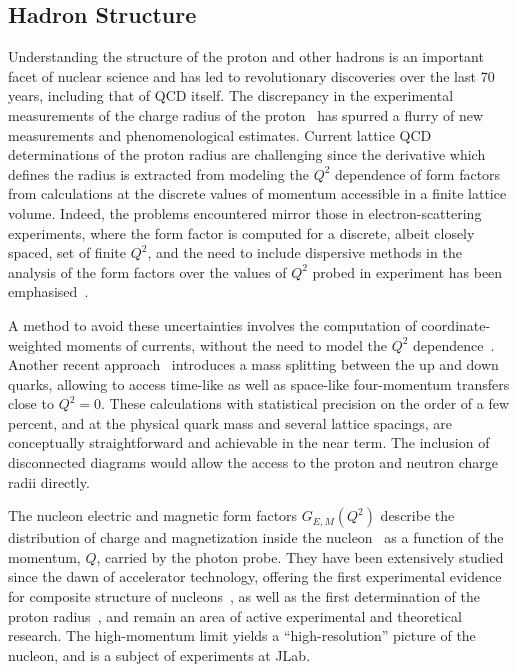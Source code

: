 


\subsection{Hadron Structure}

Understanding the structure of the proton and other hadrons is an important facet of  nuclear science and  has led to revolutionary discoveries over the last 70 years, including that of QCD itself.  
The discrepancy in the experimental measurements of the charge radius of the proton~\cite{Antognini:1900ns} has spurred a flurry of new measurements and phenomenological estimates. Current lattice QCD determinations of the proton radius are challenging since the derivative which defines the radius is extracted from modeling the $Q^2$ dependence of form factors from calculations at the discrete values of momentum accessible in a finite lattice volume.  Indeed, the problems encountered mirror those in electron-scattering experiments, where the form factor is computed for a discrete, albeit closely spaced, set of finite $Q^2$, and the need to include dispersive methods in the analysis of the form factors over the values of $Q^2$ probed in experiment has been emphasised~\cite{Alarcon:2018irp}.

A method to avoid these uncertainties involves the computation of coordinate-weighted moments of currents, without the need to model the $Q^2$ dependence~\cite{Bouchard:2016gmc}. Another recent approach~\cite{Detmold:2018ptb} introduces a mass splitting between the up and down quarks, allowing to access time-like as well as space-like four-momentum transfers close to $Q^2=0$. These calculations with statistical precision on the order of a few percent, and at the physical quark mass and several lattice spacings, are conceptually straightforward and achievable in the near term. The inclusion of disconnected diagrams would allow the access to the proton and neutron charge radii directly.

The nucleon electric and magnetic form factors $G_{E,M}(Q^2)$ describe the distribution of charge and
magnetization inside the
nucleon~\cite{Burkardt:2000za,Burkardt:2002hr,Miller:2007uy,Carlson:2007xd} as a function of the momentum, $Q$, carried by the photon probe.
They have been extensively studied since the dawn of
accelerator technology, offering the first experimental evidence for composite structure 
of nucleons~\cite{Hofstadter:1955ae}, as well as the first
determination of the proton radius~\cite{Chambers:1956zz},
and remain an area of active experimental and theoretical research. The high-momentum limit yields a ``high-resolution'' picture of the nucleon, and is a subject of experiments at JLab.

